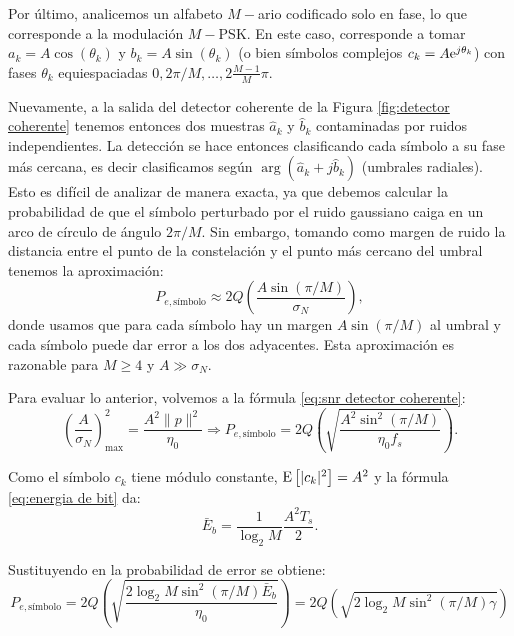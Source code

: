 \begin{ejemplo}[$M-$PSK]

    Por último, analicemos un alfabeto $M-$ario codificado solo en fase, lo que corresponde a la modulación $M-$PSK. En este caso, corresponde a tomar $a_k = A\cos(\theta_k)$ y $b_k=A\sin(\theta_k)$ (o bien símbolos complejos $c_k = A\mathrm{e}^{j\theta_k}$) con fases $\theta_k$ equiespaciadas $0,2\pi/M,\ldots,2\frac{M-1}{M}\pi$.

    Nuevamente, a la salida del detector coherente de la Figura \ref{fig:detector coherente} tenemos entonces dos muestras $\hat{a}_k$ y $\hat{b}_k$ contaminadas por ruidos independientes. La detección se hace entonces clasificando cada símbolo a su fase más cercana, es decir clasificamos según $\arg\left(\hat{a}_k + j \hat{b}_k\right)$ (umbrales radiales). Esto es difícil de analizar de manera exacta, ya que debemos calcular la probabilidad de que el símbolo perturbado por el ruido gaussiano caiga en un arco de círculo de ángulo $2\pi/M$. Sin embargo, tomando como margen de ruido la distancia entre el punto de la constelación y el punto más cercano del umbral tenemos la aproximación:
    \begin{equation*}
        P_{e,\text{símbolo}} \approx 2 Q\left(\frac{A\sin(\pi/M)}{\sigma_N}\right),
    \end{equation*}
    donde usamos que para cada símbolo hay un margen $A\sin(\pi/M)$ al umbral y cada símbolo puede dar error a los dos adyacentes. Esta aproximación es razonable para $M\geqslant 4$ y $A\gg \sigma_N$.

    Para evaluar lo anterior, volvemos a la fórmula \eqref{eq:snr detector coherente}:
    \begin{equation*}
        \left(\frac{A}{\sigma_N}\right)_{\max}^2 = \frac{A^2\|p\|^2}{\eta_0} \Rightarrow P_{e,\text{símbolo}} = 2 Q\left(\sqrt{\frac{A^2\sin^2(\pi/M)}{\eta_0 f_s}}\right).
    \end{equation*}

    Como el símbolo $c_k$ tiene módulo constante, $\mathrm{E}\left[|c_k|^2\right]=A^2$ y la fórmula \eqref{eq:energia de bit} da:
    \begin{equation*}
        \bar{E}_b = \frac{1}{\log_2 M} \frac{A^2 T_s}{2}.
    \end{equation*}

    Sustituyendo en la probabilidad de error se obtiene:
    \begin{equation*}
        P_{e,\text{símbolo}} = 2 Q\left(\sqrt{\frac{2\log_2M\sin^2(\pi/M)\bar{E}_b}{\eta_0}}\right) = 2Q\left(\sqrt{2\log_2M \sin^2(\pi/M)\gamma}\right) 
    \end{equation*}


\end{ejemplo}
